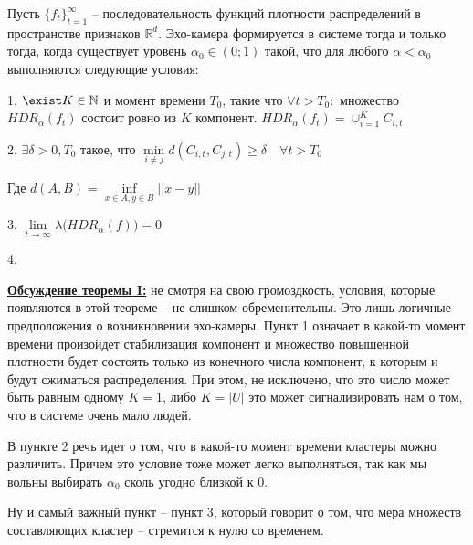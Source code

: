 \documentclass{article}
\begin{document}
Пусть $\{ f_t \}_{t=1}^{\infty}$ – последовательность функций плотности распределений в пространстве признаков $\mathbb{R}^d$. Эхо-камера формируется в системе тогда и только тогда, когда существует уровень $\alpha_0 \in (0; 1)$ такой, что для любого $\alpha < \alpha_0$ выполняются следующие условия: 

1. $\exist K \in \mathbb{N}$ и момент времени $T_0$, такие что $\forall t > T_0:$ множество $HDR_{\alpha}(f_t)$ состоит ровно из $K$ компонент. $HDR_{\alpha}(f_t) = \cup_{i=1}^K C_{i, t}$


2. $\exists \delta > 0, T_0 $ такое, что $\underset{i \neq j}{\min} d(C_{i, t}, C_{j, t}) \geq \delta  \quad \forall t > T_0$

Где $d(A, B) = \underset{x \in A, y \in B}{\inf} ||x - y||$

3. $\lim\limits_{t \rightarrow \infty} \lambda \big( HDR_{\alpha} (f) \big) = 0$

4.  


\textbf{\underline{Обсуждение теоремы I:}} не смотря на свою громоздкость, условия, которые появляются в этой теореме – не слишком обременительны. Это лишь логичные предположения о возникновении эхо-камеры. Пункт 1 означает в какой-то момент времени произойдет стабилизация компонент и множество повышенной плотности будет состоять только из конечного числа компонент, к которым и будут сжиматься распределения. При этом, не исключено, что это число может быть равным одному $K = 1$, либо $K = |U|$ это может сигнализировать нам о том, что  в системе очень мало людей. 


В пункте 2 речь идет о том, что в какой-то момент времени кластеры можно различить. Причем это условие тоже может легко выполняться, так как мы вольны выбирать $\alpha_0$ сколь угодно близкой к 0. 

Ну и самый важный пункт – пункт 3, который говорит о том, что мера множеств составляющих кластер – стремится к нулю со временем. 
\end{document}
